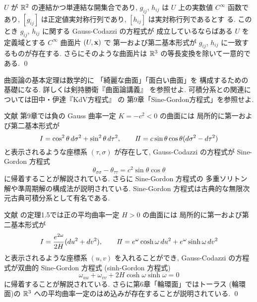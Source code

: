 \documentclass[12pt,twoside]{jarticle}
\begin{document}
\begin{theorem}[曲面論の基本定理]
 $U$ が ${\mathbb R}^2$ の連結かつ単連結な開集合であり, 
 $g_{ij}$, $h_{ij}$ は $U$ 上の実数値 $C^\infty$ 函数であり, 
 $[g_{ij}]$ は正定値実対称行列であり, $[h_{ij}]$ は実対称行列であるとす
 る. このとき $g_{ij}$, $h_{ij}$ に関する Gauss-Codazzi の方程式が
 成立しているならばある $U$ を定義域とする $C^\infty$ 曲面片 $(U,{\mathbf x})$ で
 第一および第二基本形式が $g_{ij}$, $h_{ij}$ に一致するものが存在する.
 さらにそのような曲面片は ${\mathbb R}^3$ の等長変換を除いて一意的である.
 \qed
\end{theorem}

\begin{guide}
 曲面論の基本定理は数学的に
 「綺麗な曲面」「面白い曲面」を 構成するための基礎になる.
 詳しくは剣持勝衛『曲面論講義』\cite{Kenmotsu} を参照せよ.
 可積分系との関連については田中・伊達『KdV方程式』 \cite{TD} の
 第9章「Sine-Gordon方程式」を参照せよ.

 文献 \cite{TD} 第9章では負の Gauss 曲率一定 $K=-c^2<0$ の曲面には
 局所的に第一および第二基本形式が
 \begin{equation*}
  I = \cos^2\theta\,d\sigma^2 + \sin^2\theta\,d\tau^2, \qquad
  I\!I = c\sin\theta\cos\theta(d\sigma^2 - d\tau^2)
 \end{equation*}
 と表示されるような座標系 $(\tau,\sigma)$ が存在して,
 Gauss-Codazzi の方程式が Sine-Gordon 方程式
 \begin{equation*}
  \theta_{\sigma\sigma} - \theta_{\tau\tau} = c^2 \sin\theta\cos\theta
 \end{equation*}
 に帰着することが解説されている. さらに Sine-Gordon 方程式の
 多重ソリトン解や準周期解の構成法が説明されている. 
 Sine-Gordon 方程式は古典的な無限次元古典可積分系として有名である.

 文献 \cite{Kenmotsu} の定理1.5では正の平均曲率一定 $H>0$ の曲面には
 局所的に第一および第二基本形式が
 \begin{equation*}
  I = \frac{e^{2\omega}}{2H}(du^2+dv^2), \qquad
  I\!I = e^\omega\cosh\omega\,du^2 + e^\omega\sinh\omega\,dv^2
 \end{equation*}
 と表示されるような座標系 $(u,v)$ を入れることができ, 
 Gauss-Codazzi の方程式が双曲的 Sine-Gordon 方程式 (sinh-Gordon 方程式)
 \begin{equation*}
  \omega_{uu} + \omega_{vv} + 2H\cosh\omega\sinh\omega = 0
 \end{equation*}
 に帰着することが解説されている. さらに第6章「輪環面」ではトーラス
 (輪環面)の ${\mathbb R}^3$ への平均曲率一定のはめ込みが存在することが説明されている.
 \qed
\end{guide}
\end{document}
